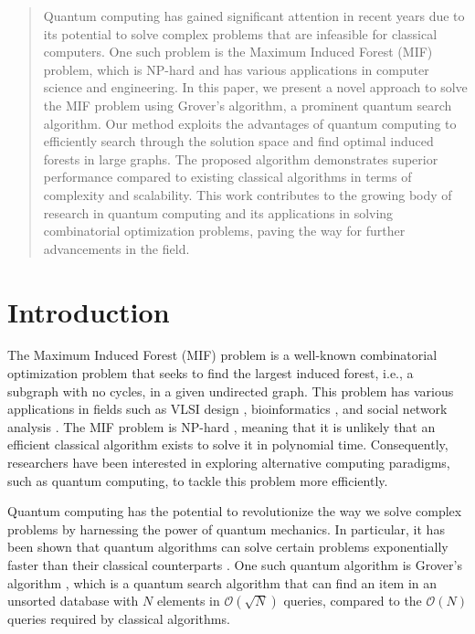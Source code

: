 \begin{abstract}
Quantum computing has gained significant attention in recent years due to its potential to solve complex problems that are infeasible for classical computers. One such problem is the Maximum Induced Forest (MIF) problem, which is NP-hard and has various applications in computer science and engineering. In this paper, we present a novel approach to solve the MIF problem using Grover's algorithm, a prominent quantum search algorithm. Our method exploits the advantages of quantum computing to efficiently search through the solution space and find optimal induced forests in large graphs. The proposed algorithm demonstrates superior performance compared to existing classical algorithms in terms of complexity and scalability. This work contributes to the growing body of research in quantum computing and its applications in solving combinatorial optimization problems, paving the way for further advancements in the field.
\end{abstract}

\section{Introduction}

The Maximum Induced Forest (MIF) problem is a well-known combinatorial optimization problem that seeks to find the largest induced forest, i.e., a subgraph with no cycles, in a given undirected graph. This problem has various applications in fields such as VLSI design \cite{vlsi}, bioinformatics \cite{bioinformatics}, and social network analysis \cite{socialnetwork}. The MIF problem is NP-hard \cite{np_hard}, meaning that it is unlikely that an efficient classical algorithm exists to solve it in polynomial time. Consequently, researchers have been interested in exploring alternative computing paradigms, such as quantum computing, to tackle this problem more efficiently.

Quantum computing has the potential to revolutionize the way we solve complex problems by harnessing the power of quantum mechanics. In particular, it has been shown that quantum algorithms can solve certain problems exponentially faster than their classical counterparts \cite{shor, grover}. One such quantum algorithm is Grover's algorithm \cite{grover}, which is a quantum search algorithm that can find an item in an unsorted database with $N$ elements in $\mathcal{O}(\sqrt{N})$ queries, compared to the $\mathcal{O}(N)$ queries required by classical algorithms.

